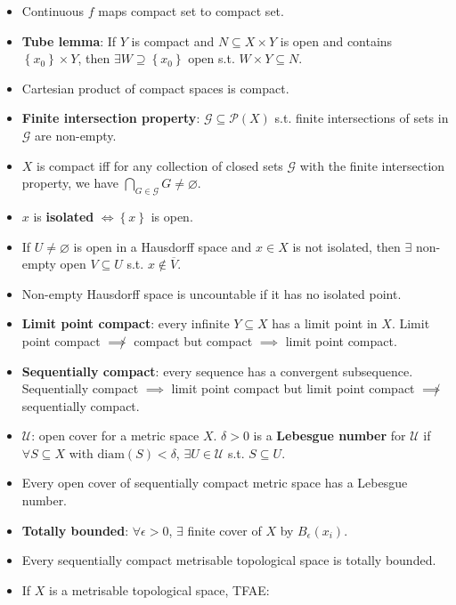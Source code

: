 \documentclass[10pt]{article}
\begin{document}
\begin{multicols*}{3}
\begin{itemize}
            \item Continuous $f$ maps compact set to compact set.
            \item \textbf{Tube lemma}: If $Y$ is compact and $N \subseteq X \times Y$ is open and contains $\left\{x_0\right\} \times Y$, then $\exists W \supseteq \left\{x_0\right\}$ open s.t. $W \times Y \subseteq N$.
            \item Cartesian product of compact spaces is compact.
            \item \textbf{Finite intersection property}: $\mathcal{G} \subseteq \mathcal{P}\left(X\right)$ s.t. finite intersections of sets in $\mathcal{G}$ are non-empty.
            \item $X$ is compact iff for any collection of closed sets $\mathcal{G}$ with the finite intersection property, we have $\bigcap_{G \in \mathcal{G}}G \neq \varnothing$.
            \item $x$ is \textbf{isolated} $\iff \left\{x\right\}$ is open.
            \item If $U \neq \varnothing$ is open in a Hausdorff space and $x \in X$ is not isolated, then $\exists$ non-empty open $V \subseteq U$ s.t. $x \notin \overline{V}$.
            \item Non-empty Hausdorff space is uncountable if it has no isolated point.
            \item \textbf{Limit point compact}: every infinite $Y \subseteq X$ has a limit point in $X$. Limit point compact $\not\implies$ compact but compact $\implies$ limit point compact.
            \item \textbf{Sequentially compact}: every sequence has a convergent subsequence. Sequentially compact $\implies$ limit point compact but limit point compact $\not\implies$ sequentially compact.
            \item $\mathcal{U}$: open cover for a metric space $X$. $\delta > 0$ is a \textbf{Lebesgue number} for $\mathcal{U}$ if $\forall S \subseteq X$ with $\mathrm{diam}\left(S\right) < \delta$, $\exists U \in \mathcal{U}$ s.t. $S \subseteq U$. 
            \item Every open cover of sequentially compact metric space has a Lebesgue number.
            \item \textbf{Totally bounded}: $\forall \epsilon > 0$, $\exists$ finite cover of $X$ by $B_{\epsilon}\left(x_i\right)$.
            \item Every sequentially compact metrisable topological space is totally bounded.
            \item If $X$ is a metrisable topological space, TFAE:

\end{itemize}
\end{multicols*}
\end{document}
